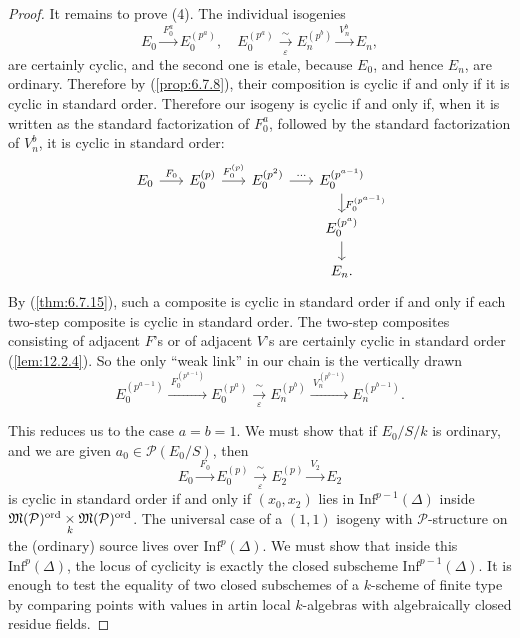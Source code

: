 \begin{proof}
It remains to prove (4). The individual isogenies
\[
E_0 \xrightarrow{\ F_0^a\ } E_0^{(p^a)} , \quad E_0^{(p^a)} \xrightarrow[\varepsilon]{\ \sim\ } E_n^{(p^b)} \xrightarrow{\ V_n^b\ } E_n ,
\]
are certainly cyclic, and the second one is etale, because $E_0$, and hence $E_n$, are ordinary. Therefore by (\ref{prop:6.7.8}), their composition is cyclic if and only if it is cyclic in standard order. Therefore our isogeny is cyclic if and only if, when it is written as the standard factorization of $F_0^a$, followed by the standard factorization of $V_n^b$, it is cyclic in standard order:
\[
\begin{tikzcd}[row sep=1.4em, column sep=1.7em]
E_0 \arrow[r, "F_0"] & E_0^{(p)} \arrow[r, "F_0^{(p)}"] & E_0^{(p^2)} \arrow[r, "\cdots"] & E_0^{(p^{a-1})} \arrow[d, "F_0^{(p^{a-1})}"] \\
& & & E_0^{(p^a)} \arrow[d] \\
& & & E_n .
\end{tikzcd}
\]
By (\ref{thm:6.7.15}), such a composite is cyclic in standard order if and only if each two-step composite is cyclic in standard order. The two-step composites consisting of adjacent $F$'s or of adjacent $V$'s are certainly cyclic in standard order (\ref{lem:12.2.4}). So the only ``weak link'' in our chain is the vertically drawn
\[
E_0^{(p^{a-1})} \xrightarrow{\ F_0^{(p^{a-1})}\ } E_0^{(p^a)} \xrightarrow[\varepsilon]{\ \sim\ } E_n^{(p^b)} \xrightarrow{\ V_n^{(p^{b-1})}\ } E_n^{(p^{b-1})} .
\]

This reduces us to the case $a = b = 1$. We must show that if $E_0/S/k$ is ordinary, and we are given $a_0 \in \mathcal{P}(E_0/S)$, then
\[
E_0 \xrightarrow{\ F_0\ } E_0^{(p)} \xrightarrow[\varepsilon]{\ \sim\ } E_2^{(p)} \xrightarrow{\ V_2\ } E_2
\]
is cyclic in standard order if and only if $(x_0, x_2)$ lies in $\mathrm{Inf}^{p-1}(\Delta)$ inside $\mathfrak{M}(\mathcal{P})^{\mathrm{ord}} \underset{k}{\times} \mathfrak{M}(\mathcal{P})^{\mathrm{ord}}$. The universal case of a $(1,1)$ isogeny with $\mathcal{P}$-structure on the (ordinary) source lives over $\mathrm{Inf}^p(\Delta)$. We must show that inside this $\mathrm{Inf}^p(\Delta)$, the locus of cyclicity is exactly the closed subscheme $\mathrm{Inf}^{p-1}(\Delta)$. It is enough to test the equality of two closed subschemes of a $k$-scheme of finite type by comparing points with values in artin local $k$-algebras with algebraically closed residue fields.


\end{proof}
